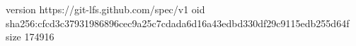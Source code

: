 version https://git-lfs.github.com/spec/v1
oid sha256:cfcd3c37931986896cec9a25c7cdada6d16a43edbd330df29c9115edb255d64f
size 174916
